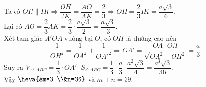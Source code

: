 \begin{ex}
{		Ta có $OH \parallel IK \Rightarrow \dfrac{OH}{IK}=\dfrac{AO}{AK}=\dfrac{2}{3}\Rightarrow OH=\dfrac{2}{3}IK=\dfrac{a\sqrt{3}}{6}$. \\
		Lại có $AO=\dfrac{2}{3}AK=\dfrac{2}{3}\cdot\dfrac{a\sqrt{3}}{2}= \dfrac{a\sqrt{3}}{3}$. \\
		Xét tam giác $A'OA$ vuông tại $O$, có $OH$ là đường cao nên
		\[
		\dfrac{1}{OH^2}=\dfrac{1}{OA^2}+\dfrac{1}{OA'^2}\Rightarrow OA'=\dfrac{OA\cdot OH}{\sqrt{OA^2-OH^2}}=\dfrac{a}{3}.
		\]
		Suy ra $V_{A'.ABC} = \dfrac{1}{3} \cdot OA' \cdot S_{\triangle ABC} = \dfrac{1}{3} \cdot \dfrac{a}{3} \cdot \dfrac{a^2\sqrt{3}}{4} = \dfrac{a^3\sqrt{3}}{36}$.\\ 
		Vậy $\heva{&m=3 \\&n=36}$ và $m+n=39$.
	}
\end{ex}

